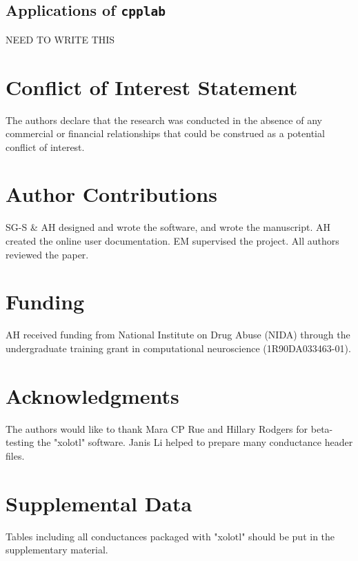 \documentclass{frontiersSCNS} %
\begin{document}
\subsection{Applications of \texttt{cpplab}}

NEED TO WRITE THIS




%
%
%
%
%
%

\section*{Conflict of Interest Statement}

The authors declare that the research was conducted in the absence of any commercial or financial relationships that could be construed as a potential conflict of interest.

\section*{Author Contributions}

SG-S & AH designed and wrote the software, and wrote the manuscript. AH created the online user documentation. EM supervised the project. All authors reviewed the paper.

\section*{Funding}

AH received funding from National Institute on Drug Abuse (NIDA) through the undergraduate training grant in computational neuroscience (1R90DA033463-01).

\section*{Acknowledgments}
The authors would like to thank Mara CP Rue and Hillary Rodgers for beta-testing the "xolotl" software. Janis Li helped to prepare many conductance header files.

\section*{Supplemental Data}
Tables including all conductances packaged with "xolotl" should be put in the supplementary material.
\end{document}
